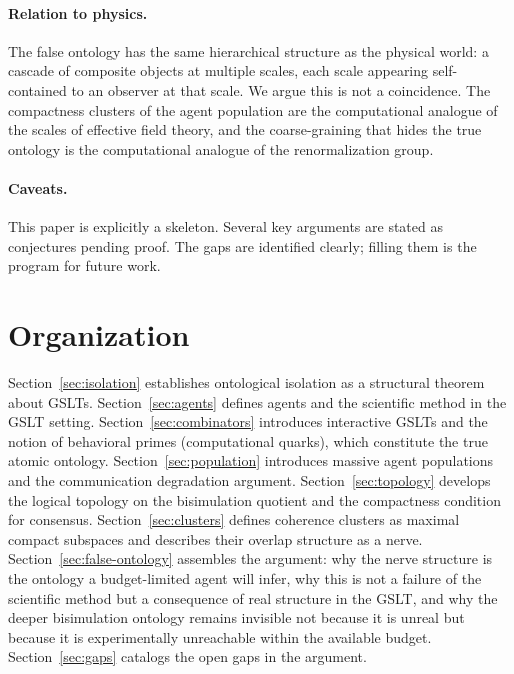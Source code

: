\paragraph{Relation to physics.}
The false ontology has the same hierarchical structure as the
physical world: a cascade of composite objects at multiple scales,
each scale appearing self-contained to an observer at that scale.
We argue this is not a coincidence.
The compactness clusters of the agent population are the computational
analogue of the scales of effective field theory, and the coarse-graining
that hides the true ontology is the computational analogue of the
renormalization group.

\paragraph{Caveats.}
This paper is explicitly a skeleton.
Several key arguments are stated as conjectures pending proof.
The gaps are identified clearly; filling them is the program for future work.

\section{Organization}

Section~\ref{sec:isolation} establishes ontological isolation as a
structural theorem about GSLTs.
Section~\ref{sec:agents} defines agents and the scientific method
in the GSLT setting.
Section~\ref{sec:combinators} introduces interactive GSLTs and the
notion of behavioral primes (computational quarks), which constitute
the true atomic ontology.
Section~\ref{sec:population} introduces massive agent populations and
the communication degradation argument.
Section~\ref{sec:topology} develops the logical topology on the
bisimulation quotient and the compactness condition for consensus.
Section~\ref{sec:clusters} defines coherence clusters as maximal
compact subspaces and describes their overlap structure as a nerve.
Section~\ref{sec:false-ontology} assembles the argument: why the
nerve structure is the ontology a budget-limited agent will infer,
why this is not a failure of the scientific method but a consequence
of real structure in the GSLT, and why the deeper bisimulation
ontology remains invisible not because it is unreal but because it
is experimentally unreachable within the available budget.
Section~\ref{sec:gaps} catalogs the open gaps in the argument.

